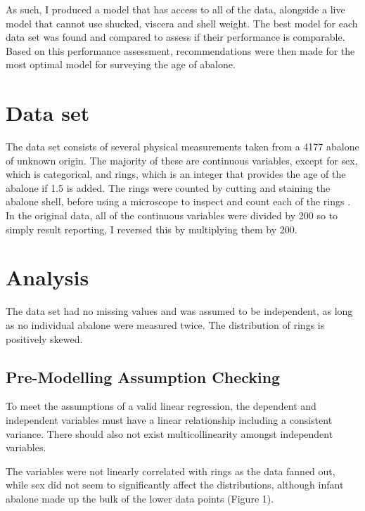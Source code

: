 \documentclass[a4paper,9pt,twocolumn,twoside,]{pinp}
\begin{document}
As such, I produced a model that has access to all of the data,
alongside a live model that cannot use shucked, viscera and shell
weight. The best model for each data set was found and compared to
assess if their performance is comparable. Based on this performance
assessment, recommendations were then made for the most optimal model
for surveying the age of abalone.

\hypertarget{data-set}{%
\section{Data set}\label{data-set}}

The data set consists of several physical measurements taken from a 4177
abalone of unknown origin. The majority of these are continuous
variables, except for sex, which is categorical, and rings, which is an
integer that provides the age of the abalone if 1.5 is added. The rings
were counted by cutting and staining the abalone shell, before using a
microscope to inspect and count each of the rings \citep{abalone}. In
the original data, all of the continuous variables were divided by 200
so to simply result reporting, I reversed this by multiplying them by
200.

\hypertarget{analysis}{%
\section{Analysis}\label{analysis}}

The data set had no missing values and was assumed to be independent, as
long as no individual abalone were measured twice. The distribution of
rings is positively skewed.

\hypertarget{pre-modelling-assumption-checking}{%
\subsection{Pre-Modelling Assumption
Checking}\label{pre-modelling-assumption-checking}}

To meet the assumptions of a valid linear regression, the dependent and
independent variables must have a linear relationship including a
consistent variance. There should also not exist multicollinearity
amongst independent variables.

The variables were not linearly correlated with rings as the data fanned
out, while sex did not seem to significantly affect the distributions,
although infant abalone made up the bulk of the lower data points
(Figure 1).
\end{document}
